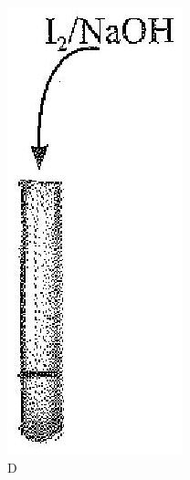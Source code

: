 \documentclass[10pt]{article}
\begin{document}
\begin{figure}[h]
\begin{center}
  \includegraphics[width=\textwidth]{2025_10_23_fa9073eecee116ad8cf2g-81}
\captionsetup{labelformat=empty}
\caption{D}
\end{center}
\end{figure}
\end{document}
